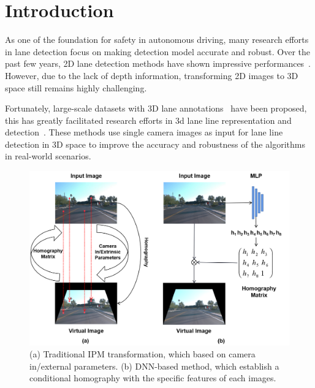 \section{Introduction}
\label{sec:intro}

As one of the foundation for safety in autonomous driving, many research efforts in lane detection focus on making detection model accurate and robust.
Over the past few years, 2D lane detection methods have shown impressive performances~\cite{jin2022eigenlanes, hou2019learning, liu2021end, wang2022keypoint, huang2023anchor3dlane}.
However, due to the lack of depth information, transforming 2D images to 3D space still remains highly challenging.

Fortunately, large-scale datasets with 3D lane annotations~\cite{chen2022persformer, garnett20193d, guo2020gen, yan2022once} have been proposed, this has greatly facilitated research efforts in 3d lane line representation and detection~\cite{chen2022persformer, efrat20203d, efrat20203d, garnett20193d, guo2020gen, liu2022learning, yan2022once, huang2023anchor3dlane}.
These methods use single camera images as input for lane line detection in 3D space to improve the accuracy and robustness of the algorithms in real-world scenarios.

\begin{figure}[ht]
    \centering
    \includegraphics[width=\linewidth]{asset/fig1_compare}
    \caption{(a) Traditional IPM transformation, which based on camera in/external parameters. (b) DNN-based method, which establish a conditional homography with the specific features of each images.}
    \label{fig:intro}
\end{figure}

